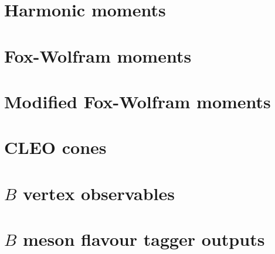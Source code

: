 \section{Harmonic moments}\label{sec:harmonic_moments}

\newpage

\section{Fox-Wolfram moments}\label{sec:fox_wolfram_moments}

\newpage

\section{Modified Fox-Wolfram moments}\label{sec:modified_fox_wolfram_moments}

\newpage

\section{CLEO cones}\label{sec:cleo_cones}

\newpage

% 

\section{\texorpdfstring{$B$}{B} vertex observables}\label{sec:vertex_features}

\newpage

\section{\texorpdfstring{$B$}{B} meson flavour tagger outputs}\label{sec:flavour_tagger_outputs}
